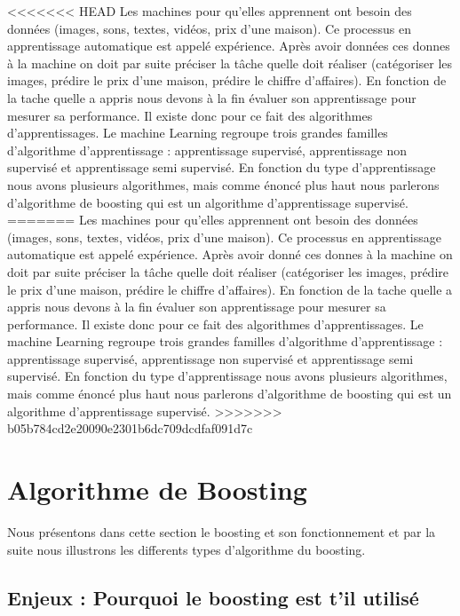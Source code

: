 \documentclass[french,a4paper,12pt]{article}
\begin{document}
<<<<<<< HEAD
\quad Les machines pour qu’elles apprennent ont besoin des données (images, sons, textes, vidéos, prix d’une maison). Ce processus en apprentissage automatique est appelé expérience. Après avoir données ces donnes à la machine on doit par suite préciser la tâche  quelle doit réaliser (catégoriser les images, prédire le prix d’une maison, prédire le chiffre d’affaires). En fonction de la tache quelle a appris nous devons à la fin évaluer son apprentissage pour mesurer sa performance. Il existe donc pour ce fait des algorithmes d’apprentissages. Le machine Learning regroupe trois grandes familles d’algorithme d’apprentissage : apprentissage supervisé, apprentissage non supervisé et apprentissage semi supervisé. En fonction du type d’apprentissage nous avons plusieurs algorithmes, mais comme énoncé plus haut nous parlerons d’algorithme de boosting qui est un algorithme d’apprentissage supervisé\citep{elnaqa}. 
=======
\quad Les machines pour qu’elles apprennent ont besoin des données (images, sons, textes, vidéos, prix d’une maison). Ce processus en apprentissage automatique est appelé expérience. Après avoir donné ces donnes à la machine on doit par suite préciser la tâche  quelle doit réaliser (catégoriser les images, prédire le prix d’une maison, prédire le chiffre d’affaires). En fonction de la tache quelle a appris nous devons à la fin évaluer son apprentissage pour mesurer sa performance. Il existe donc pour ce fait des algorithmes d’apprentissages. Le machine Learning regroupe trois grandes familles d’algorithme d’apprentissage : apprentissage supervisé, apprentissage non supervisé et apprentissage semi supervisé. En fonction du type d’apprentissage nous avons plusieurs algorithmes, mais comme énoncé plus haut nous parlerons d’algorithme de boosting qui est un algorithme d’apprentissage supervisé\citep{elnaqa}. 
>>>>>>> b05b784cd2e20090e2301b6dc709dcdfaf091d7c

\section{Algorithme de Boosting}
\quad 
Nous présentons dans cette section le boosting et son fonctionnement et par la suite nous  illustrons les differents types d'algorithme du boosting.

 \subsection{Enjeux : Pourquoi le boosting est t'il utilisé}
\end{document}
